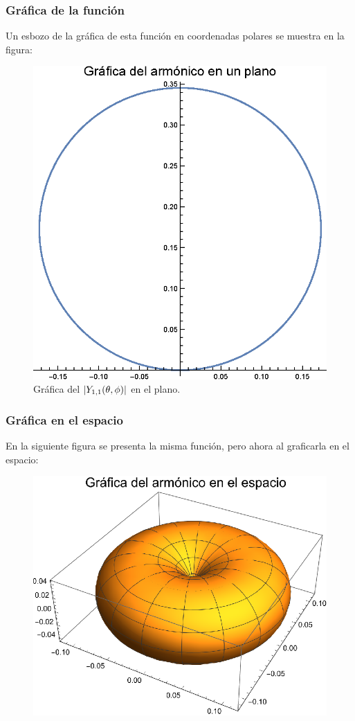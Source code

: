 \documentclass[12pt]{beamer}
\begin{document}
\begin{frame}
\frametitle{Gráfica de la función}
Un esbozo de la gráfica de esta función en coordenadas polares se muestra en la figura:
\pause
\begin{figure}[H]
    \centering
    \includegraphics[scale=0.48]{Imagenes/Plot_Y11_01.eps}
    \caption{Gráfica del $\abs{Y_{1, 1} (\theta, \phi)}$ en el plano.}
\end{figure}
\end{frame}
\begin{frame}
\frametitle{Gráfica en el  espacio}
En la siguiente figura se presenta la misma función, pero ahora al graficarla en el espacio:
\pause
\begin{figure}[H]
    \centering
    \includegraphics[scale=0.7]{Imagenes/Plot_Y11_02.eps}
    \label{fig:figura_plot_Y11_02}
\end{figure}
\end{frame}
\end{document}
